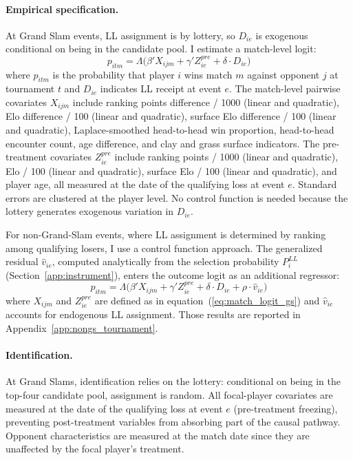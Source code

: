 \paragraph{Empirical specification.} At Grand Slam events, LL assignment is by lottery, so $D_{ie}$ is exogenous conditional on being in the candidate pool. I estimate a match-level logit:
\begin{equation}
\label{eq:match_logit_gs}
p_{itm} = \Lambda\bigl(\beta' X_{ijm} + \gamma' Z^{pre}_{ie} + \delta \cdot D_{ie}\bigr)
\end{equation}
where $p_{itm}$ is the probability that player $i$ wins match $m$ against opponent $j$ at tournament $t$ and $D_{ie}$ indicates LL receipt at event $e$. The match-level pairwise covariates $X_{ijm}$ include ranking points difference / 1000 (linear and quadratic), Elo difference / 100 (linear and quadratic), surface Elo difference / 100 (linear and quadratic), Laplace-smoothed head-to-head win proportion, head-to-head encounter count, age difference, and clay and grass surface indicators. The pre-treatment covariates $Z^{pre}_{ie}$ include ranking points / 1000 (linear and quadratic), Elo / 100 (linear and quadratic), surface Elo / 100 (linear and quadratic), and player age, all measured at the date of the qualifying loss at event $e$. Standard errors are clustered at the player level. No control function is needed because the lottery generates exogenous variation in $D_{ie}$.

For non-Grand-Slam events, where LL assignment is determined by ranking among qualifying losers, I use a control function approach. The generalized residual $\hat{v}_{ie}$, computed analytically from the selection probability $P_i^{LL}$ (Section~\ref{app:instrument}), enters the outcome logit as an additional regressor:
\begin{equation}
\label{eq:match_logit_cf_mech}
p_{itm} = \Lambda\bigl(\beta' X_{ijm} + \gamma' Z^{pre}_{ie} + \delta \cdot D_{ie} + \rho \cdot \hat{v}_{ie}\bigr)
\end{equation}
where $X_{ijm}$ and $Z^{pre}_{ie}$ are defined as in equation~(\ref{eq:match_logit_gs}) and $\hat{v}_{ie}$ accounts for endogenous LL assignment. Those results are reported in Appendix~\ref{app:nongs_tournament}.

\paragraph{Identification.} At Grand Slams, identification relies on the lottery: conditional on being in the top-four candidate pool, assignment is random. All focal-player covariates are measured at the date of the qualifying loss at event $e$ (pre-treatment freezing), preventing post-treatment variables from absorbing part of the causal pathway. Opponent characteristics are measured at the match date since they are unaffected by the focal player's treatment.

